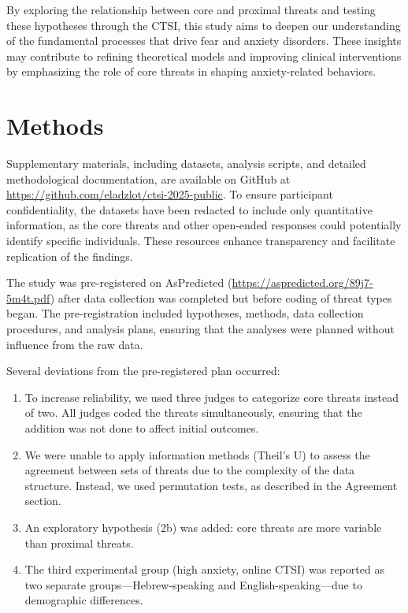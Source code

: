 \documentclass[
  man,floatsintext]{apa7}
\providecommand{\tightlist}{%
  \setlength{\itemsep}{0pt}\setlength{\parskip}{0pt}}
\begin{document}
By exploring the relationship between core and proximal threats and testing these hypotheses through the CTSI, this study aims to deepen our understanding of the fundamental processes that drive fear and anxiety disorders.
These insights may contribute to refining theoretical models and improving clinical interventions by emphasizing the role of core threats in shaping anxiety-related behaviors.

\section{Methods}\label{methods}

Supplementary materials, including datasets, analysis scripts, and detailed methodological documentation, are available on GitHub at \url{https://github.com/eladzlot/ctsi-2025-public}.
To ensure participant confidentiality, the datasets have been redacted to include only quantitative information, as the core threats and other open-ended responses could potentially identify specific individuals.
These resources enhance transparency and facilitate replication of the findings.

The study was pre-registered on AsPredicted (\url{https://aspredicted.org/89j7-5m4t.pdf}) after data collection was completed but before coding of threat types began. The pre-registration included hypotheses, methods, data collection procedures, and analysis plans, ensuring that the analyses were planned without influence from the raw data.

Several deviations from the pre-registered plan occurred:

\begin{enumerate}
\def\labelenumi{\arabic{enumi}.}
\tightlist
\item
  To increase reliability, we used three judges to categorize core threats instead of two. All judges coded the threats simultaneously, ensuring that the addition was not done to affect initial outcomes.
\item
  We were unable to apply information methods (Theil's U) to assess the agreement between sets of threats due to the complexity of the data structure. Instead, we used permutation tests, as described in the Agreement section.\\
\item
  An exploratory hypothesis (2b) was added: core threats are more variable than proximal threats.\\
\item
  The third experimental group (high anxiety, online CTSI) was reported as two separate groups---Hebrew-speaking and English-speaking---due to demographic differences.
\end{enumerate}
\end{document}
